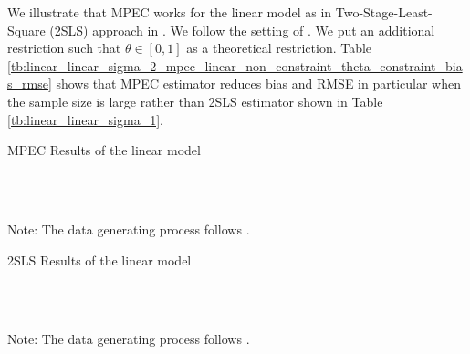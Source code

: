 \documentclass[11pt, a4paper]{article}
\begin{document}
We illustrate that MPEC works for the linear model as in Two-Stage-Least-Square (2SLS) approach in \cite{matsumura2023resolving}. 
We follow the setting of \cite{matsumura2023resolving}.
We put an additional restriction such that $\theta\in[0,1]$ as a theoretical restriction. 
Table \ref{tb:linear_linear_sigma_2_mpec_linear_non_constraint_theta_constraint_bias_rmse} shows that MPEC estimator reduces bias and RMSE in particular when the sample size is large rather than 2SLS estimator shown in Table \ref{tb:linear_linear_sigma_1}.

\begin{table}[!htbp]
  \begin{center}
      \caption{MPEC Results of the linear model}
      \label{tb:linear_linear_sigma_2_mpec_linear_non_constraint_theta_constraint_bias_rmse} 
      \subfloat[$\sigma=0.5$]{}\\
      \subfloat[$\sigma=1.0$]{}\\
    \subfloat[$\sigma=2.0$]{}
  \end{center}
  \footnotesize
  Note: The data generating process follows \cite{matsumura2023resolving}.
\end{table} 


\begin{table}[!htbp]
  \begin{center}
      \caption{2SLS Results of the linear model}
      \label{tb:linear_linear_sigma_1} 
      \subfloat[$\sigma=0.5$]{}\\
      \subfloat[$\sigma=1.0$]{}\\
    \subfloat[$\sigma=2.0$]{}
  \end{center}
  \footnotesize
  Note: The data generating process follows \cite{matsumura2023resolving}.
\end{table} 


\newpage

\end{document}
